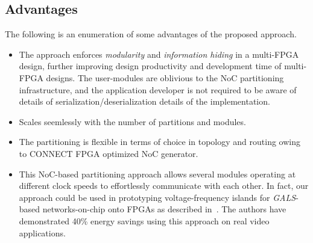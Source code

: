 \documentclass[conference, 9pt]{IEEEtran}
\begin{document}
\subsection{Advantages}

The following is an enumeration of some advantages of the proposed approach.
\begin{itemize}
\item The approach enforces  \emph{modularity} and \emph{information hiding} in a multi-FPGA design, further improving design productivity and development time of multi-FPGA designs. 
The user-modules are oblivious to the NoC partitioning infrastructure, and the application developer is not required to be aware of details of serialization/deserialization details of the implementation.
\item Scales seemlessly with the number of partitions and modules.
\item The partitioning is flexible in terms of choice in topology and routing owing to CONNECT FPGA optimized NoC generator.
\item This NoC-based partitioning approach allows several modules operating at different clock speeds to effortlessly communicate with each other.%
In fact, our approach could be used in prototyping voltage-frequency islands for \emph{GALS}-based networks-on-chip onto FPGAs as described in~\cite{ogras2007voltage}. The authors have demonstrated 40\% energy savings using this approach on real video applications.
\end{itemize}
\end{document}
